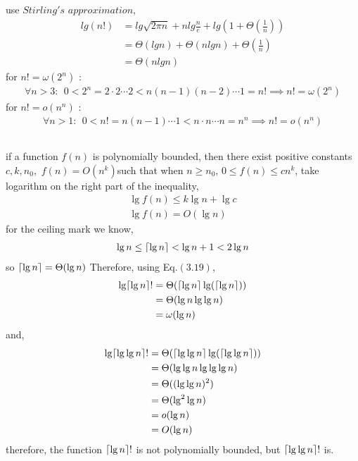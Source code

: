 \documentclass[paper=a4, fontsize=11pt,oneside]{book} %
\numberwithin{equation}{section} %
\numberwithin{figure}{section} %
\numberwithin{table}{section} %
\DeclarePairedDelimiter{\ceil}{\lceil}{\rceil}
\begin{document}
		\subsection{}
			use $Stirling's$ $approximation$,
			\begin{align*}
			lg(n!) & = lg\sqrt{2\pi n} + nlg\frac{n}{e} + lg(1 + \Theta(\frac{1}{n}))\\
			& = \Theta(lgn) + \Theta(nlgn) + \Theta(\frac{1}{n}) \\
			& = \Theta(nlgn)
			\end{align*}
			for $n! = \omega(2^n)$ :
			\begin{align*}
			\forall n > 3:\ \ 	0 < 2^n = 2 \cdot 2 \cdots 2 < n(n-1)(n-2)\cdots1 = n! \implies n! = \omega(2^n)
			\end{align*}
			for $n! = o(n^n)$ :
			\begin{align*}
			\forall n > 1:\ \ 0 < n! = n(n-1)\cdots1 < n\cdot n\cdots n = n^n \implies n! = o(n^n)
			\end{align*}
			
		\subsection{}
		if a function $f(n)$ is polynomially bounded, then there exist positive constants $c,k,n_0,$ $f(n) = O(n^k)$such that when $n \geq n_0$,
		$0 \leq f(n) \leq cn^k$,
		take logarithm on the right part of the inequality,
		\begin{align*}
		\lg f(n) \leq k\lg n + \lg c \\
		\lg f(n) = O(\lg n)
		\end{align*}
		 for the ceiling mark we know,
		\begin{align*}
		\lg n \leq \ceil*{\lg n} < \lg n + 1 < 2\lg n
		\end{align*}
		so $\ceil*{\lg n} = \Theta(\lg n)$
		Therefore, using Eq.$(3.19)$,
		\begin{align*}
		\lg \ceil*{\lg n}! &= \Theta(\ceil*{\lg n} \lg (\ceil*{\lg n})) \\
		& = \Theta(\lg n \lg \lg n) \\
		& = \omega(\lg n)
		\end{align*}
		and,
				\begin{align*}
				\lg \ceil*{\lg \lg n}! &= \Theta(\ceil*{\lg \lg n} \lg (\ceil*{\lg \lg n})) \\
				& = \Theta(\lg \lg n \lg \lg \lg n) \\
				& = \Theta{((\lg \lg n)^2)} \\
				& = \Theta(\lg^2 \lg n) \\
				& = o(\lg n) \\
				& = O(\lg n)
				\end{align*}
		therefore, the function $\ceil*{\lg n}!$ is not polynomially bounded, but 
		$\ceil*{\lg \lg n}!$ is.
	
\end{document}
